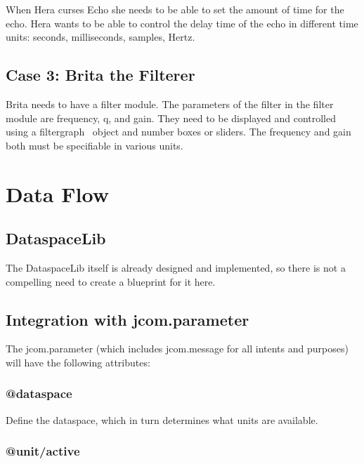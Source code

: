 \documentclass[]{article}
\begin{document}
When Hera curses Echo she needs to be able to set the amount of time for the echo.  Hera wants to be able to control the delay time of the echo in different time units: seconds, milliseconds, samples, Hertz.


\subsection{Case 3: Brita the Filterer}

Brita needs to have a filter module.  The parameters of the filter in the filter module are frequency, q, and gain.  They need to be displayed and controlled using a filtergraph~ object and number boxes or sliders.  The frequency and gain both must be specifiable in various units.




\section{Data Flow}

\subsection{DataspaceLib}

The DataspaceLib itself is already designed and implemented, so there is not a compelling need to create a blueprint for it here.



\subsection{Integration with jcom.parameter}

The jcom.parameter (which includes jcom.message for all intents and purposes) will have the following attributes:


\subsubsection{@dataspace}

Define the dataspace, which in turn determines what units are available.




\subsubsection{@unit/active}
\end{document}
